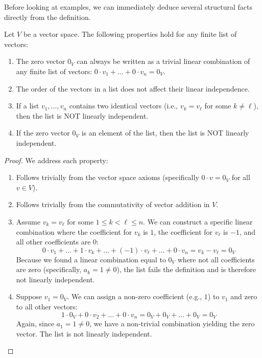 Before looking at examples, we can immediately deduce several structural facts directly from the definition.

\begin{lemma}
\label{lem:independence_basics}
Let $V$ be a vector space. The following properties hold for any finite list of vectors:
\begin{enumerate}[label=\textbf{(\alph*)}]
    \item The zero vector $0_V$ can always be written as a trivial linear combination of any finite list of vectors: $0 \cdot v_1 + \dots + 0 \cdot v_n = 0_V$.
    \item The order of the vectors in a list does not affect their linear independence.
    \item If a list $v_1, \dots, v_n$ contains two identical vectors (i.e., $v_k = v_\ell$ for some $k \ne \ell$), then the list is NOT linearly independent.
    \item If the zero vector $0_V$ is an element of the list, then the list is NOT linearly independent.
\end{enumerate}
\end{lemma}

\begin{proof}
We address each property:
\begin{enumerate}[label=\textbf{(\alph*)}]
    \item Follows trivially from the vector space axioms (specifically $0 \cdot v = 0_V$ for all $v \in V$).
    \item Follows trivially from the commutativity of vector addition in $V$.
    \item Assume $v_k = v_\ell$ for some $1 \le k < \ell \le n$. We can construct a specific linear combination where the coefficient for $v_k$ is $1$, the coefficient for $v_\ell$ is $-1$, and all other coefficients are $0$:
    \[
    0 \cdot v_1 + \dots + 1 \cdot v_k + \dots + (-1) \cdot v_\ell + \dots + 0 \cdot v_n = v_k - v_\ell = 0_V
    \]
    Because we found a linear combination equal to $0_V$ where not all coefficients are zero (specifically, $a_k = 1 \ne 0$), the list fails the definition and is therefore not linearly independent.

    \item Suppose $v_1 = 0_V$. We can assign a non-zero coefficient (e.g., $1$) to $v_1$ and zero to all other vectors:
    \[
    1 \cdot 0_V + 0 \cdot v_2 + \dots + 0 \cdot v_n = 0_V + 0_V + \dots + 0_V = 0_V
    \]
    Again, since $a_1 = 1 \ne 0$, we have a non-trivial combination yielding the zero vector. The list is not linearly independent.
\end{enumerate}
\end{proof}

